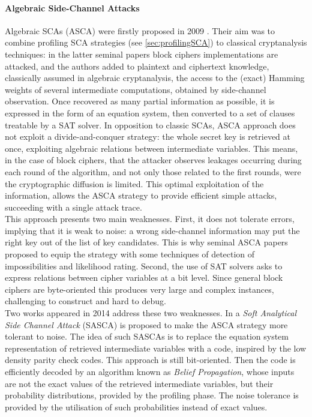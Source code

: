 \paragraph*{Algebraic Side-Channel Attacks}\label{sec:ASCA}
Algebraic SCAs (ASCA) were firstly proposed in 2009 \cite{ASCA,renauld2009algebraic}. Their aim was to combine profiling SCA strategies (see \ref{sec:profilingSCA}) to classical cryptanalysis techniques: in the latter seminal papers block ciphers implementations are attacked, and the authors added to plaintext and ciphertext knowledge, classically assumed in algebraic cryptanalysis, the access to the (exact) Hamming weights of  several intermediate computations, obtained by side-channel observation. Once recovered as many partial information as possible, it is expressed in the form of an equation system, then converted to a set of clauses treatable by a SAT solver. In opposition to classic SCAs, ASCA approach does not exploit a divide-and-conquer strategy: the whole secret key is retrieved at once, exploiting algebraic relations between intermediate variables. This means, in the case of block ciphers, that the attacker observes leakages occurring during each round of the algorithm, and not only those related to the first rounds, were the cryptographic diffusion is limited. This optimal exploitation of the information, allows the ASCA strategy to provide efficient simple attacks, \ie succeeding with a single attack trace.\\
This approach presents two main weaknesses. First, it does not tolerate errors, implying that it is weak to noise: a wrong side-channel information may put the right key out of the list of key candidates. This is why seminal ASCA papers proposed to equip the strategy with some techniques of detection of impossibilities and likelihood rating. Second, the use of SAT solvers asks to express relations between cipher variables at a bit level. Since general block ciphers are byte-oriented this produces very large and complex instances, challenging to construct and hard to debug.\\
Two works appeared in 2014 address these two weaknesses. In \cite{soft} a \emph{Soft Analytical Side Channel Attack} (SASCA) is proposed to make the ASCA strategy more tolerant to noise. The idea of such SASCAs is to replace the equation system representation of retrieved intermediate variables with a code, inspired by the low density parity check codes. This approach is still bit-oriented. Then the code is efficiently decoded by an algorithm known as \emph{Belief Propagation}, whose inputs are not the exact values of the retrieved intermediate variables, but their probability distributions, provided by the profiling phase. The noise tolerance is provided by the utilisation of such probabilities instead of exact values. \\
